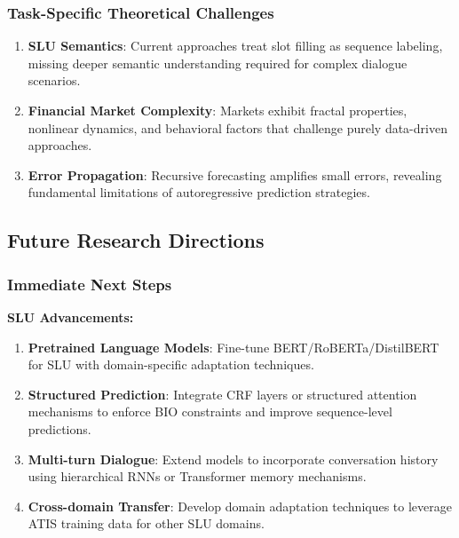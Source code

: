 \documentclass[conference]{IEEEtran}
\begin{document}
\subsubsection{Task-Specific Theoretical Challenges}
\begin{enumerate}
  \item \textbf{SLU Semantics}: Current approaches treat slot filling as sequence labeling, missing deeper semantic understanding required for complex dialogue scenarios.

  \item \textbf{Financial Market Complexity}: Markets exhibit fractal properties, nonlinear dynamics, and behavioral factors that challenge purely data-driven approaches.

  \item \textbf{Error Propagation}: Recursive forecasting amplifies small errors, revealing fundamental limitations of autoregressive prediction strategies.
\end{enumerate}

\subsection{Future Research Directions}

\subsubsection{Immediate Next Steps}

\textbf{SLU Advancements:}
\begin{enumerate}
  \item \textbf{Pretrained Language Models}: Fine-tune BERT/RoBERTa/DistilBERT for SLU with domain-specific adaptation techniques.

  \item \textbf{Structured Prediction}: Integrate CRF layers or structured attention mechanisms to enforce BIO constraints and improve sequence-level predictions.

  \item \textbf{Multi-turn Dialogue}: Extend models to incorporate conversation history using hierarchical RNNs or Transformer memory mechanisms.

  \item \textbf{Cross-domain Transfer}: Develop domain adaptation techniques to leverage ATIS training data for other SLU domains.
\end{enumerate}
\end{document}
